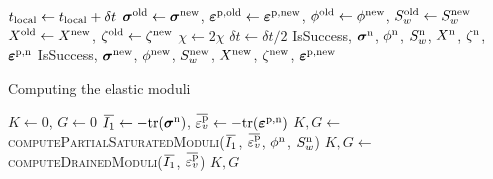 \begin{breakablealgorithm}
\begin{algorithmic}[1]
           \State $ t_{\text{local}} \leftarrow t_{\text{local}} + \delta t$
           \State $\boldsymbol{\sigma}^{\text{old}} \leftarrow \boldsymbol{\sigma}^{\text{new}}$, $\boldsymbol{\varepsilon}^{\text{p},\text{old}} \leftarrow \boldsymbol{\varepsilon}^{\text{p},\text{new}}$,
                  $\phi^{\text{old}} \leftarrow \phi^{\text{new}}$, $S_w^{\text{old}} \leftarrow S_w^{\text{new}}$ 
                  $X^{\text{old}} \leftarrow X^{\text{new}}$, $\zeta^{\text{old}} \leftarrow \zeta^{\text{new}}$ 
        \Else
           \State $\chi \leftarrow 2\chi$
           \State $\delta t \leftarrow \delta t/2$
             \State \Return IsSuccess, $\boldsymbol{\sigma}^{\text{n}}$, $\phi^{\text{n}}$, $S_w^{\text{n}}$, $X^{\text{n}}$, $\zeta^{\text{n}}$,
                                            $\boldsymbol{\varepsilon}^{\text{p},\text{n}}$ 
           \EndIf
        \EndIf
      \State \Return IsSuccess, $\boldsymbol{\sigma}^{\text{new}}$, $\phi^{\text{new}}$, $S_w^{\text{new}}$, $X^{\text{new}}$, $\zeta^{\text{new}}$,
                                            $\boldsymbol{\varepsilon}^{\text{p},\text{new}}$ 
      
    \EndProcedure
  \end{algorithmic}
\end{breakablealgorithm}

\begin{breakablealgorithm}
  \caption{Computing the elastic moduli}
  \begin{algorithmic}[1]
      \State $K \leftarrow 0$, $G \leftarrow 0$
      \State $\Ionebar \leftarrow -\Tr(\Bsig^\Tn)$, 
             $\bar{\Veps^\Tp_v} \leftarrow -\Tr(\Bveps^{\Tp,\Tn})$
        \State $K, G \leftarrow$ \textsc{computePartialSaturatedModuli}($\Ionebar$, $\bar{\Veps^\Tp_v}$,
                                                                        $\phi^{\text{n}}$, $S_w^{\text{n}}$)
      \Else
        \State $K, G \leftarrow$ \textsc{computeDrainedModuli}($\Ionebar$, $\bar{\Veps^\Tp_v}$)
      \EndIf
      \State \Return $K, G$
    \EndProcedure
  \end{algorithmic}
\end{breakablealgorithm}

